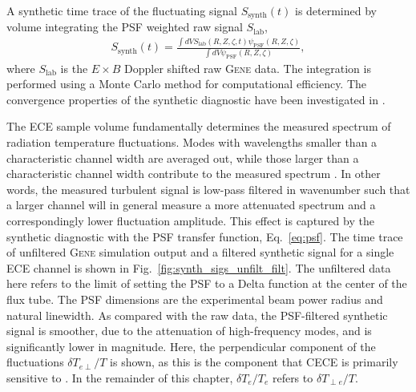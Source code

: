 \documentclass[%
 aip,
 amsmath,amssymb,
 reprint,%
]{revtex4-1}
\newcommand{\gene}[1]{\rmfamily\textsc{Gene}#1}
\begin{document}
A synthetic time trace of the fluctuating signal $S_{\mathrm{synth}}(t)$ is determined by volume integrating the PSF weighted raw signal $S_{\mathrm{lab}}$,
 \begin{align}
 	S_{\mathrm{synth}}(t) = \frac{\int dV S_{\mathrm{lab}}(R,Z,\zeta,t)\psi_{\mathrm{PSF}}(R,Z,\zeta)}{\int dV \psi_{\mathrm{PSF}}(R,Z,\zeta)}, \label{eq:synth_int}
 \end{align}
 where $S_{\mathrm{lab}}$ is the $E \times B$ Doppler shifted raw \gene{} data. The integration is performed using a Monte Carlo method for computational efficiency. The convergence properties of the synthetic diagnostic have been investigated in \cite{anna-bs}.


The ECE sample volume fundamentally determines the measured spectrum of radiation temperature fluctuations. Modes with wavelengths smaller than a characteristic channel width are averaged out, while those larger than a characteristic channel width contribute to the measured spectrum \cite{ross1991dispersion,bravenec_wootton_spatial}. In other words, the measured turbulent signal is low-pass filtered in wavenumber such that a larger channel will in general measure a more attenuated spectrum and a correspondingly lower fluctuation amplitude. This effect is captured by the synthetic diagnostic with the PSF transfer function, Eq.\ \eqref{eq:psf}. The time trace of unfiltered \gene{} simulation output and a filtered synthetic signal for a single ECE channel is shown in Fig.\ \ref{fig:synth_sigs_unfilt_filt}. The unfiltered data here refers to the limit of setting the PSF to a Delta function at the center of the flux tube. The PSF dimensions are the experimental beam power radius and natural linewidth. As compared with the raw data, the PSF-filtered synthetic signal is smoother, due to the attenuation of high-frequency modes, and is significantly lower in magnitude. Here, the perpendicular component of the fluctuations $\delta T_{e \perp}/T$ is shown, as this is the component that CECE is primarily sensitive to \cite{hartfuss1996temperature}. In the remainder of this chapter, $\delta T_e/T_e$ refers to $\delta T_{\perp e}/T$.
\end{document}
